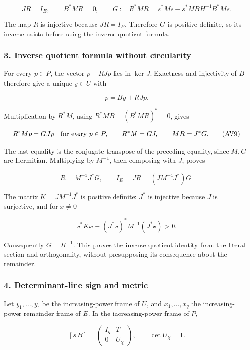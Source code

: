 \[
JR=I_E,\qquad B^*MR=0,\qquad
G:=R^*MR=s^*Ms-s^*MBH^{-1}B^*Ms.
\tag{AV7}
\]

The map \(R\) is injective because \(JR=I_E\). Therefore \(G\) is positive definite, so its inverse exists before using the inverse quotient formula.

\subsubsection{3. Inverse quotient formula without circularity}\label{endpoint-variation_review--inverse-quotient-formula-without-circularity}

For every \(p\in P\), the vector \(p-RJp\) lies in \(\ker J\). Exactness and injectivity of \(B\) therefore give a unique \(y\in U\) with

\[
p=By+RJp.
\tag{AV8}
\]

Multiplication by \(R^*M\), using \(R^*MB=(B^*MR)^*=0\), gives

\[
R^*Mp=GJp\quad\hbox{for every }p\in P,\qquad
R^*M=GJ,\qquad MR=J^*G.
\tag{AV9}
\]

The last equality is the conjugate transpose of the preceding equality, since \(M,G\) are Hermitian. Multiplying by \(M^{-1}\), then composing with \(J\), proves

\[
R=M^{-1}J^*G,\qquad
I_E=JR=(JM^{-1}J^*)G.
\tag{AV10}
\]

The matrix \(K=JM^{-1}J^*\) is positive definite: \(J^*\) is injective because \(J\) is surjective, and for \(x\ne0\)

\[
x^*Kx=(J^*x)^*M^{-1}(J^*x)>0.
\tag{AV11}
\]

Consequently \(G=K^{-1}\). This proves the inverse quotient identity from the literal section and orthogonality, without presupposing its consequence about the remainder.

\subsubsection{4. Determinant-line sign and metric}\label{endpoint-variation_review--determinant-line-sign-and-metric}

Let \(y_1,\ldots,y_r\) be the increasing-power frame of \(U\), and \(x_1,\ldots,x_q\) the increasing-power remainder frame of \(E\). In the increasing-power frame of \(P\),

\[
[s\ B]=
\begin{pmatrix}I_q&T\\0&U_\chi\end{pmatrix},\qquad
\det U_\chi=1.
\tag{AV12}
\]

